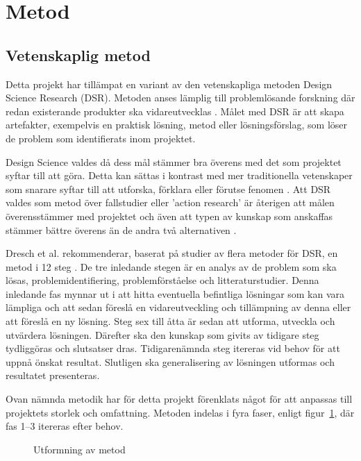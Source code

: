\section{Metod} %
\label{sec:metod}
    
    \subsection{Vetenskaplig metod} %
    \label{sub:vetenskaplig_metod}
    	Detta projekt har tillämpat en variant av den vetenskapliga metoden Design Science Research (DSR). Metoden anses lämplig till problemlösande forskning där redan existerande produkter ska vidareutvecklas \cite{dsr}. Målet med DSR är att skapa artefakter, exempelvis en praktisk lösning, metod eller lösningsförslag, som löser de problem som identifierats inom projektet. \bigskip

        Design Science valdes då dess mål stämmer bra överens med det som projektet syftar till att göra. Detta kan sättas i kontrast med mer traditionella vetenskaper som snarare syftar till att utforska, förklara eller förutse fenomen \cite[s.~13]{dsr}. Att DSR valdes som metod över fallstudier eller 'action research' är återigen att målen överensstämmer med projektet och även att typen av kunskap som anskaffas stämmer bättre överens än de andra två alternativen \cite[s.~95]{dsr}.\bigskip

    	Dresch et al. rekommenderar, baserat på studier av flera metoder för DSR, en metod i 12 steg \cite[s.~118--126]{dsr}. De tre inledande stegen är en analys av de problem som ska lösas, problemidentifiering, problemförståelse och litteraturstudier. Denna inledande fas mynnar ut i att hitta eventuella befintliga lösningar som kan vara lämpliga och att sedan föreslå en vidareutveckling och tillämpning av denna eller att föreslå en ny lösning. Steg sex till åtta är sedan att utforma, utveckla och utvärdera lösningen. Därefter ska den kunskap som givits av tidigare steg tydliggöras och slutsatser dras. Tidigarenämnda steg itereras vid behov för att uppnå önskat resultat. Slutligen ska generalisering av lösningen utformas och resultatet presenteras. \bigskip

    	Ovan nämnda metodik har för detta projekt förenklats något för att anpassas till projektets storlek och omfattning. Metoden indelas i fyra faser, enligt figur~\ref{fig:method}, där fas 1--3 itereras efter behov.

        \begin{figure}[b]
            \centering
            
            \caption{\label{fig:method} Utformning av metod}
        \end{figure}


